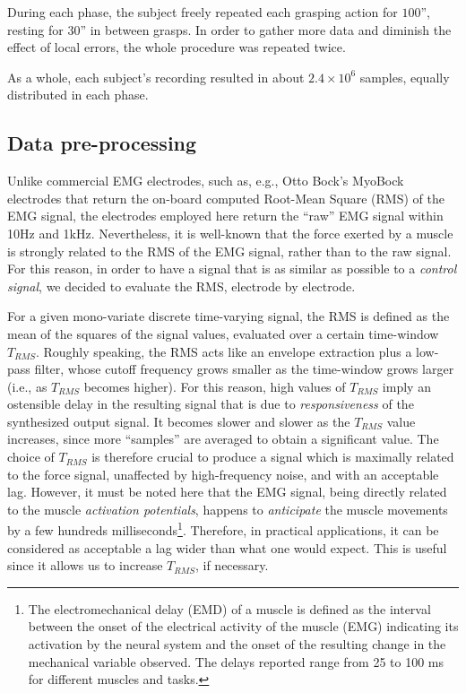During each phase, the subject freely repeated each grasping action for $100$'', resting for $30$'' in between grasps. In order to gather more data and diminish the effect of local errors, the whole procedure was repeated twice.

As a whole, each subject's recording resulted in about $2.4\times 10^6$ samples, equally distributed in each phase.

\subsection{Data pre-processing}

Unlike commercial EMG electrodes, such as, e.g., Otto Bock's MyoBock electrodes \cite{ottobock} that return the on-board computed Root-Mean Square (RMS) of the EMG signal, the electrodes employed here return the ``raw'' EMG signal within 10Hz and 1kHz. %
Nevertheless, it is well-known \cite{deluca,zecca} that the force exerted by a muscle is strongly related to the RMS of the EMG signal, rather than to the raw signal. For this reason, in order to have a signal that is as similar as possible to a \emph{control signal}, we decided to evaluate the RMS, electrode by electrode.

For a given mono-variate discrete time-varying signal, the RMS is defined as the mean of the squares of the signal values, evaluated over a certain time-window $T_{RMS}$. Roughly speaking, the RMS acts like an envelope extraction plus a low-pass filter, whose cutoff frequency grows smaller as the time-window grows larger (i.e., as $T_{RMS}$ becomes higher). 
For this reason, high values of $T_{RMS}$ imply an ostensible delay in the resulting signal that is due to \emph{responsiveness} of the synthesized output signal. 
It becomes slower and slower as the $T_{RMS}$ value increases, since more ``samples'' are averaged to obtain a significant value. The choice of $T_{RMS}$ is therefore crucial
 to produce a signal which is maximally related to the force signal, unaffected by high-frequency noise, and with an acceptable lag. However, it must be noted here that the EMG signal, being directly related to the muscle \emph{activation potentials}, happens to \emph{anticipate} the muscle movements by a few hundreds milliseconds\footnote{The electromechanical delay (EMD) of a muscle is 
defined as the interval between the onset of the electrical activity of the muscle (EMG) indicating its activation by the neural system and 
the onset of the resulting change in the mechanical variable observed. The delays reported range from 25 to 100 ms for different muscles and tasks\cite{Wolf1994}.}. 
Therefore, in practical applications, 
it can be considered as acceptable a lag wider than what one would expect.
This is useful since it allows us to increase $T_{RMS}$, if necessary.

